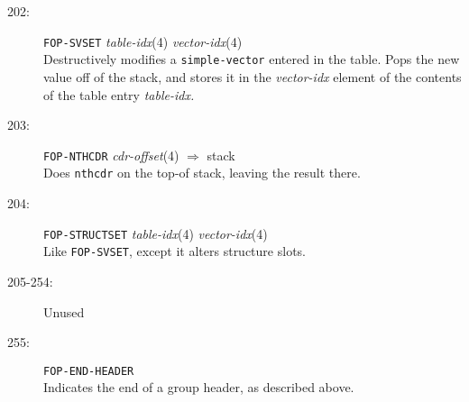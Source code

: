 \begin{description}
\item[202:] \hspace{2em} {\tt FOP-SVSET} \hspace{2em} {\it table-idx}(4)
\hspace{2em} {\it vector-idx}(4)\\
Destructively modifies a {\tt simple-vector} entered in the table.  Pops the
new value off of the stack, and stores it in the {\it vector-idx} element of
the contents of the table entry {\it table-idx.}

\item[203:] \hspace{2em} {\tt FOP-NTHCDR} \hspace{2em} {\it cdr-offset}(4)
\hspace{2em} $\Rightarrow$ \hspace{2em} stack\\
Does {\tt nthcdr} on the top-of stack, leaving the result there.

\item[204:] \hspace{2em} {\tt FOP-STRUCTSET} \hspace{2em} {\it table-idx}(4)
\hspace{2em} {\it vector-idx}(4)\\
Like {\tt FOP-SVSET}, except it alters structure slots.

\item[205-254:] Unused
\item[255:] \hspace{2em} {\tt FOP-END-HEADER} \\ Indicates the end of a group header,
as described above.
\end{description}

